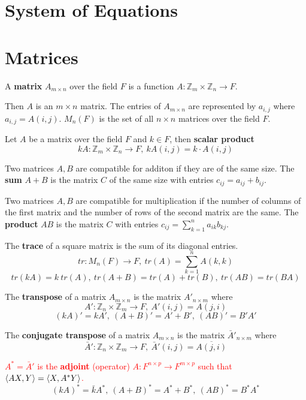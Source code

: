 \section{System of Equations}
\section{Matrices}
\begin{definition}
	A \textbf{matrix} $A_{m \times n}$ over the field $F$ is a function $A : \mathbb{Z}_m \times \mathbb{Z}_n \to F$.
\end{definition}
	Then $A$ is an $m \times n$ matrix.
	The entries of $A_{m \times n}$ are represented by $a_{i,j}$ where $a_{i,j} = A(i,j)$.
	$M_n(F)$ is the set of all $n \times n$ matrices over the field $F$.

\begin{definition}
	Let $A$ be a matrix over the field $F$ and $k \in F$, then \textbf{scalar product}
	$$kA : \mathbb{Z}_m \times \mathbb{Z}_n \to F,\ kA(i,j) = k \cdot A(i,j)$$
\end{definition}

\begin{definition}
	Two matrices $A,B$ are compatible for additon if they are of the same size.
	The \textbf{sum} $A+B$ is the matrix $C$ of the same size with entries $c_{ij} = a_{ij} + b_{ij}$.
\end{definition}

\begin{definition}
	Two matrices $A,B$ are compatible for multiplication if the number of columns of the first matrix and the number of rows of the second matrix are the same.
	The \textbf{product} $AB$ is the matrix $C$ with entries
	$ c_{ij} = \sum_{k=1}^n a_{ik}b_{kj}$.
\end{definition}
\begin{definition}
	The \textbf{trace} of a square matrix is the sum of its diagonal entries.
	$$ tr : M_n(F) \to F,\ tr(A) = \sum_{k=1}^n A(k,k) $$
	$$tr(kA) = k\ tr(A),\ tr(A+B) = tr(A) + tr(B),\ tr(AB) = tr(BA)$$
\end{definition}

\begin{definition}
	The \textbf{transpose} of a matrix $A_{m \times n}$ is the matrix $A'_{n \times m}$ where
		$$A' : \mathbb{Z}_n \times \mathbb{Z}_m \to F,\ A'(i,j) = A(j,i)$$
		$$(kA)'=kA',\ (A+B)'=A'+B',\ (AB)'=B'A'$$
\end{definition}

\begin{definition}
	The \textbf{conjugate transpose} of a matrix $A_{m \times n}$ is the matrix $\bar{A}'_{n \times m}$ where
		$$\bar{A}' : \mathbb{Z}_n \times \mathbb{Z}_m \to F,\ \bar{A}'(i,j) = \overline{A(j,i)}$$
\end{definition}
	\textcolor{red}{$A^\ast = \bar{A}'$ is the \textbf{adjoint} (operator) $A : F^{n \times p} \to F^{m \times p}$ such that $\left\langle AX,Y \right\rangle = \left\langle X,A^\ast Y \right\rangle$.}
	$$(kA)^\ast = \bar{k}A^\ast,\ (A+B)^\ast = A^\ast + B^\ast,\ (AB)^\ast = B^\ast A^\ast$$

